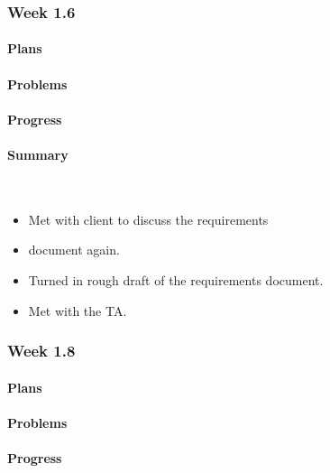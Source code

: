 \documentclass[onecolumn, draftclsnofoot,10pt, compsoc]{article}
\begin{document}
		\subsubsection{Week 1.6}

		    \paragraph{Plans} \hfill \break

		    \paragraph{Problems} \hfill \break

		    \paragraph{Progress} \hfill \break

		    \paragraph{Summary} \hfill \
		        \begin{itemize}
		            \item Met with client to discuss the requirements \item document again.
                    \item Turned in rough draft of the requirements document.
                    \item Met with the TA. \\
                \end{itemize}


		\subsubsection{Week 1.8}

			\paragraph{Plans} \hfill \break

		    \paragraph{Problems} \hfill \break

		    \paragraph{Progress} \hfill \break
\end{document}
